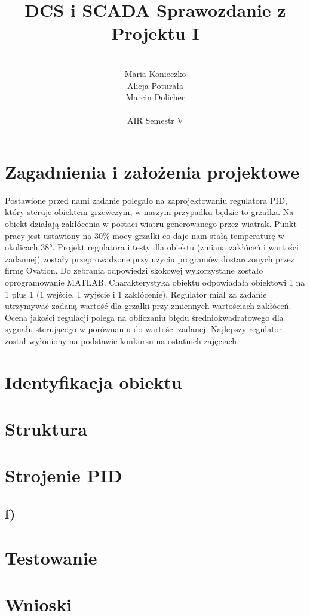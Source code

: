 \documentclass[12pt, a4paper]{article}
\author{
	\\ Maria Konieczko
	\\ Alicja Poturała
	\\ Marcin Dolicher
	\\
	\\ AIR Semestr V
}
\title{
    \quad \quad DCS i SCADA
	\newline
	Sprawozdanie z Projektu I		
}
\date{}
\begin{document}
\maketitle
\newpage
\tableofcontents

\newpage
\section{Zagadnienia i założenia projektowe}
Postawione przed nami zadanie polegało na zaprojektowaniu regulatora PID, który steruje obiektem grzewczym, w naszym przypadku będzie to grzałka. Na obiekt działają zakłócenia w postaci wiatru generowanego przez wiatrak. Punkt pracy jest ustawiony na $30 \%$ mocy grzałki co daje nam stałą temperaturę w okolicach \ang{38}. Projekt regulatora i testy dla obiektu (zmiana zakłóceń i wartości zadannej) zostały przeprowadzone przy użyciu programów dostarczonych przez firmę Ovation. Do zebrania odpowiedzi skokowej wykorzystane zostało oprogramowanie MATLAB. Charakterystyka obiektu odpowiadała obiektowi 1 na 1 plus 1 (1 wejście, 1 wyjście i 1 zakłócenie). Regulator miał za zadanie utrzymywać zadaną wartość dla grzałki przy zmiennych wartościach zakłóceń. Ocena jakości regulacji polega na obliczaniu błędu średniokwadratowego dla sygnału sterującego w porównaniu do wartości zadanej. Najlepszy regulator został wyłoniony na podstawie konkursu na ostatnich zajęciach. 
\section{Identyfikacja obiektu}

\section{Struktura}

\section{Strojenie PID}

\subsection{f) }
\begin{figure}[h!]
\end{figure}

\section{Testowanie}

\section{Wnioski}
\end{document}
